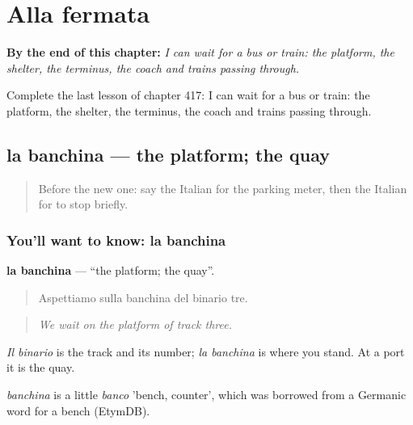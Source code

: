 
\chapter{Alla fermata}
\label{ch:it-alla-fermata}

\begin{chapteropening}
\textbf{By the end of this chapter:} \emph{I can wait for a bus or train: the platform, the shelter, the terminus, the coach and trains passing through.}

Complete the last lesson of chapter 417: I can wait for a bus or train: the platform, the shelter, the terminus, the coach and trains passing through.
\end{chapteropening}

\section[la banchina]{la banchina — the platform; the quay}

\label{lesson:IT-C417-banchina}



\begin{quote}
Before the new one: say the Italian for the parking meter, then the Italian for to stop briefly.
\end{quote}

\subsection*{You'll want to know: la banchina}
\textbf{la banchina} — \textquotedblleft{}the platform; the quay\textquotedblright{}.

\begin{quote}
Aspettiamo sulla banchina del binario tre.
\end{quote}

\begin{quote}
\emph{We wait on the platform of track three.}
\end{quote}

\emph{Il binario} is the track and its number; \emph{la banchina} is where you stand. At a port it is the quay.

\begin{cousinweb}
\emph{banchina} is a little \emph{banco} 'bench, counter', which was borrowed from a Germanic word for a bench (EtymDB).
\end{cousinweb}


